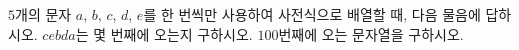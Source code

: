 $5$개의 문자 $a$, $b$, $c$, $d$, $e$를 한 번씩만 사용하여 사전식으로 배열할 때, 다음 물음에 답하시오.
 $cebda$는 몇 번째에 오는지 구하시오.
 $100$번째에 오는 문자열을 구하시오.
